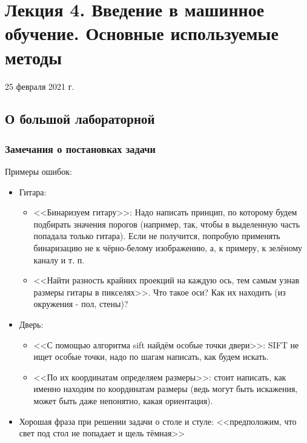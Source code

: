 \documentclass[main.tex]{subfiles}
\begin{document}
\section{Лекция 4. Введение в машинное обучение. Основные используемые методы}
25 февраля 2021 г.

\subsection{О большой лабораторной}

\subsubsection{Замечания о постановках задачи}

Примеры ошибок:

\begin{itemize}
	\item Гитара:
	\begin{itemize}[noitemsep]
		\item <<Бинаризуем гитару>>:
		Надо написать принцип, по которому будем подбирать значения порогов (например, так, чтобы в выделенную часть попадала только гитара).
		Если не получится, попробую применять бинаризацию не к чёрно-белому изображению, а, к примеру, к зелёному каналу и т. п.
		\item <<Найти разность крайних проекций на каждую ось, тем самым узнав размеры гитары в пикселях>>.
		Что такое оси?
		Как их находить (из окружения - пол, стены)?
	\end{itemize}
	
	\item Дверь:
	
	\begin{itemize}[noitemsep]
		\item <<С помощью алгоритма sift найдём особые точки двери>>: SIFT не ищет особые точки, надо по шагам написать, как будем искать.
		\item <<По их координатам определяем размеры>>: стоит написать, как именно находим по координатам размеры (ведь могут быть искажения, может быть даже непонятно, какая ориентация).
	\end{itemize}
	
	\item Хорошая фраза при решении задачи о столе и стуле: <<предположим, что свет под стол не попадает и щель тёмная>>
	
\end{itemize}
\end{document}
